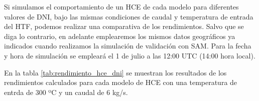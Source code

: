 Si simulamos el comportamiento de un HCE de cada modelo para  diferentes valores de DNI, bajo las mismas condiciones de caudal y temperatura de entrada del HTF, podemos realizar una comparativa de los rendimientos. Salvo que se diga lo contrario, en adelante emplearemos los mismos datos geográficos ya indicados cuando realizamos la simulación de validación con SAM. Para la fecha y hora de simulación se empleará el 1 de julio a las 12:00 UTC (14:00 hora local).

En la tabla \ref{tab:rendimiento_hce_dni} se muestran los resultados de los rendimientos calculados para cada modelo de HCE con una temperatura de entrda de 300 ºC y un caudal de 6 kg/s.
\begin{table}[h!]
\centering
\caption{Rendimiento en función de la radiación normal incidente para  distintos modelos de HCE}
\label{tab:rendimiento_hce_dni}
\end{table}

